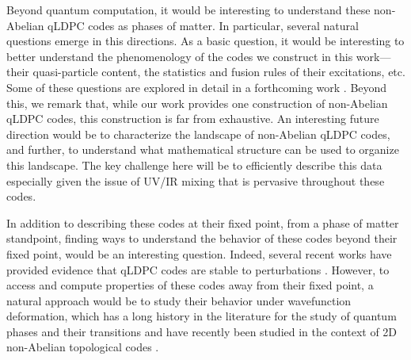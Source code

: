 \documentclass[aps,prx,reprint,superscriptaddress,nofootinbib]{revtex4-2}
\theoremstyle{definition}
\newcommand{\<}{\langle}
\renewcommand{\>}{\rangle}
\begin{document}
Beyond quantum computation, it would be interesting to understand these non-Abelian qLDPC codes as phases of matter.
%
In particular, several natural questions emerge in this directions.
%
As a basic question, it would be interesting to better understand the phenomenology of the codes we construct in this work---their quasi-particle content, the statistics and fusion rules of their excitations, etc.
%
Some of these questions are explored in detail in a forthcoming work \cite{homologicalorder}.
%
Beyond this, we remark that, while our work provides one construction of non-Abelian qLDPC codes, this construction is far from exhaustive.
%
An interesting future direction would be to characterize the landscape of non-Abelian qLDPC codes, and further, to understand what mathematical structure can be used to organize this landscape.
%
The key challenge here will be to efficiently describe this data especially given the issue of UV/IR mixing that is pervasive throughout these codes\cite{rakovszky2023physicsgoodldpccodes, rakovszky2024physicsgoodldpccodes, Tan_2025}.
%

In addition to describing these codes at their fixed point, from a phase of matter standpoint, finding ways to understand the behavior of these codes beyond their fixed point, would be an interesting question.
%
Indeed, several recent works have provided evidence that qLDPC codes are stable to perturbations \cite{yin_low-density_2025, de_roeck_low-density_2025}.
%
However, to access and compute properties of these codes away from their fixed point, a natural approach would be to study their behavior under wavefunction deformation, which has a long history in the literature for the study of quantum phases and their transitions\cite{Freedman2003, Freedman04, Freedman05a, Freedman05b, castelnovo2008, Fendley_2008, Fidkowski2009, Fendley13, haegeman_2015_gauging, zhu2019gapless, schotte2019tensornetwork, xu2020tensor, xu2021characterization, sala_2025_decoherence, stability_2025_sala, sahay2025enforcedgaplessnessstatesexponentially} and have recently been studied in the context of 2D non-Abelian topological codes \cite{sala_2025_decoherence, stability_2025_sala}.
%
\end{document}
